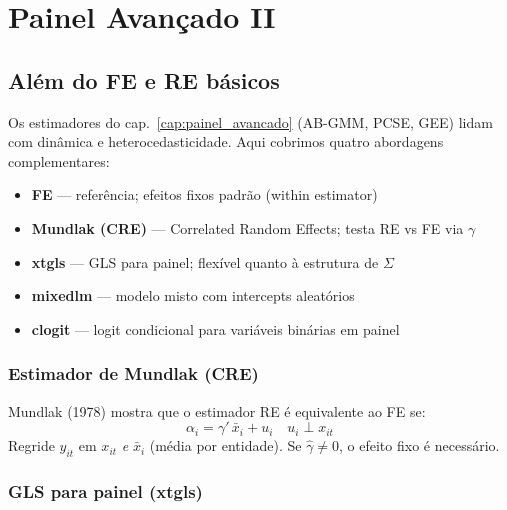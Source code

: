 \chapter{Painel Avançado II}
\label{cap:painel2}

\section{Além do FE e RE básicos}

Os estimadores do cap.~\ref{cap:painel_avancado} (AB-GMM, PCSE, GEE) lidam
com dinâmica e heterocedasticidade. Aqui cobrimos quatro abordagens complementares:

\begin{itemize}
  \item \textbf{FE} — referência; efeitos fixos padrão (within estimator)
  \item \textbf{Mundlak (CRE)} — Correlated Random Effects; testa RE vs FE via $\gamma$
  \item \textbf{xtgls} — GLS para painel; flexível quanto à estrutura de $\Sigma$
  \item \textbf{mixedlm} — modelo misto com intercepts aleatórios
  \item \textbf{clogit} — logit condicional para variáveis binárias em painel
\end{itemize}

\subsection*{Estimador de Mundlak (CRE)}

Mundlak (1978) mostra que o estimador RE é equivalente ao FE se:
\[
  \alpha_i = \gamma'\,\bar{x}_i + u_i \quad u_i \perp x_{it}
\]
Regride $y_{it}$ em $x_{it}$ \emph{e} $\bar{x}_i$ (média por entidade).
Se $\hat{\gamma} \neq 0$, o efeito fixo é necessário.

\subsection*{GLS para painel (xtgls)}

